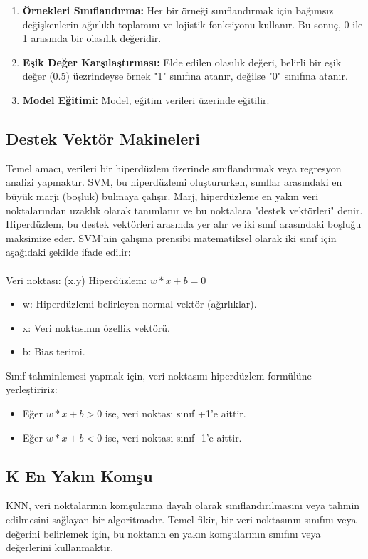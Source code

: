\begin{enumerate}
\item \textbf{Örnekleri Sınıflandırma:} Her bir örneği sınıflandırmak için bağımsız değişkenlerin ağırlıklı toplamını ve lojistik fonksiyonu kullanır. Bu sonuç, 0 ile 1 arasında bir olasılık değeridir.
\item \textbf{Eşik Değer Karşılaştırması:} Elde edilen olasılık değeri, belirli bir eşik değer (0.5) üezrindeyse örnek "1" sınıfına atanır, değilse "0" sınıfına atanır.
\item \textbf{Model Eğitimi:} Model, eğitim verileri üzerinde eğitilir.
\end{enumerate}

\subsection{Destek Vektör Makineleri}
Temel amacı, verileri bir hiperdüzlem üzerinde sınıflandırmak veya regresyon analizi yapmaktır. SVM, bu hiperdüzlemi oluştururken, sınıflar arasındaki en büyük marjı (boşluk) bulmaya çalışır. Marj, hiperdüzleme en yakın veri noktalarından uzaklık olarak tanımlanır ve bu noktalara "destek vektörleri" denir. Hiperdüzlem, bu destek vektörleri arasında yer alır ve iki sınıf arasındaki boşluğu maksimize eder. SVM'nin çalışma prensibi matematiksel olarak iki sınıf için aşağıdaki şekilde ifade edilir: \\
\\
Veri noktası: (x,y) Hiperdüzlem: ${w * x + b = 0}$
\begin{itemize}
\item w: Hiperdüzlemi belirleyen normal vektör (ağırlıklar).
\item x: Veri noktasının özellik vektörü.
\item b: Bias terimi.
\end{itemize}

Sınıf tahminlemesi yapmak için, veri noktasını hiperdüzlem formülüne yerleştiririz:
\begin{itemize}
\item Eğer ${w * x+b>0}$ ise, veri noktası sınıf +1'e aittir.
\item Eğer ${w * x+b<0}$ ise, veri noktası sınıf -1'e aittir.
\end{itemize}

\subsection{K En Yakın Komşu}
KNN, veri noktalarının komşularına dayalı olarak sınıflandırılmasını veya tahmin edilmesini sağlayan bir algoritmadır. Temel fikir, bir veri noktasının sınıfını veya değerini belirlemek için, bu noktanın en yakın komşularının sınıfını veya değerlerini kullanmaktır.

